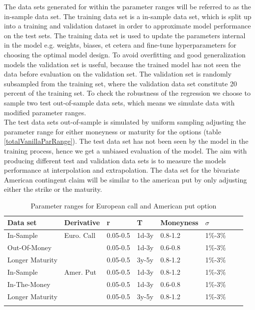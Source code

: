 The data sets generated for within the parameter ranges will be referred to as the in-sample data set. The training data set is a in-sample data set, which is split up into a training and validation dataset in order to approximate model performance on the test sets. The training data set is used to update the parameters internal in the model e.g. weights, biases, et cetera and fine-tune hyperparameters for choosing the optimal model design. To avoid overfitting and good generalization models the validation set is useful, because the trained model has not seen the data before evaluation on the validation set. The validation set is randomly subsampled from the training set, where the validation data set constitute 20 percent of the training set. To check the robustness of the regression we choose to sample two test out-of-sample data sets, which means we simulate data with modified parameter ranges. \\

The test data sets out-of-sample is simulated by uniform sampling adjusting the parameter range for either moneyness or maturity for the options (table \ref{totalVanillaParRange}). The test data set has not been seen by the model in the training process, hence we get a unbiased evaluation of the model. The aim with producing different test and validation data sets is to measure the models performance at interpolation and extrapolation. The data set for the bivariate American contingent claim will be similar to the american put by only adjusting either the strike or the maturity.\\

\begin{table}[th]
\caption{Parameter ranges for European call and American put option}
\label{tab:totalVanillaParRange}
\centering
\begin{tabular}{l l l l l l l l }
\toprule
\textbf{Data set} & Derivative  & \textbf{r} & \textbf{T} & \textbf{Moneyness} & \textbf{$\sigma$} \\
\midrule
In-Sample & Euro. Call & 0.05-0.5 & 1d-3y & 0.8-1.2 & 1\%-3\%\\ 
Out-Of-Money & & 0.05-0.5 & 1d-3y & 0.6-0.8 & 1\%-3\%\\
Longer Maturity & & 0.05-0.5 & 3y-5y & 0.8-1.2 & 1\%-3\%\\
In-Sample & Amer. Put & 0.05-0.5 & 1d-3y & 0.8-1.2 & 1\%-3\%\\ 
In-The-Money & & 0.05-0.5 & 1d-3y & 0.6-0.8 & 1\%-3\%\\
Longer Maturity & & 0.05-0.5 & 3y-5y & 0.8-1.2 & 1\%-3\%\\
\bottomrule\\
\end{tabular}
\end{table}

